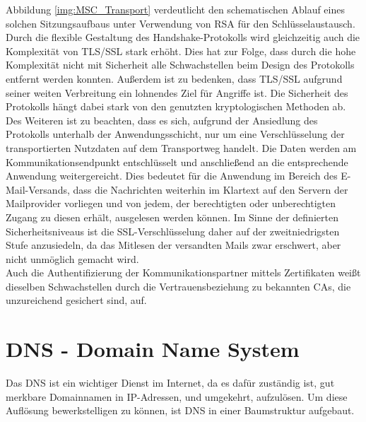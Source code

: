 \documentclass  [paper=a4,
				fontsize=12pt,
				listof=totoc,
				bibliography=totoc
				]{scrreprt}
\begin{document}
			Abbildung \ref{img:MSC_Transport} verdeutlicht den schematischen Ablauf eines solchen Sitzungsaufbaus unter Verwendung von \ac{RSA} für den Schlüsselaustausch.\medskip\\
			Durch die flexible Gestaltung des Handshake-Protokolls wird gleichzeitig auch die Komplexität von \ac{TLS/SSL} stark erhöht. 
			Dies hat zur Folge, dass durch die hohe Komplexität nicht mit Sicherheit alle Schwachstellen beim Design des Protokolls entfernt werden konnten. 
			Außerdem ist zu bedenken, dass \ac{TLS/SSL} aufgrund seiner weiten Verbreitung ein lohnendes Ziel für Angriffe ist. Die Sicherheit des Protokolls hängt dabei stark von den genutzten kryptologischen Methoden ab. \newpage
			Des Weiteren ist zu beachten, dass es sich, aufgrund der Ansiedlung des Protokolls unterhalb der Anwendungsschicht, nur um eine Verschlüsselung der transportierten Nutzdaten auf dem Transportweg handelt. 
			Die Daten werden am Kommunikationsendpunkt entschlüsselt und anschließend an die entsprechende Anwendung weitergereicht.
			Dies bedeutet für die Anwendung im Bereich des E-Mail-Versands, dass die Nachrichten weiterhin im Klartext auf den Servern der Mailprovider vorliegen und von jedem, der berechtigten oder unberechtigten Zugang zu diesen erhält, ausgelesen werden können.
			Im Sinne der definierten Sicherheitsniveaus ist die \ac{SSL}-Verschlüsselung daher auf der zweitniedrigsten Stufe anzusiedeln, da das Mitlesen der versandten Mails zwar erschwert, aber nicht unmöglich gemacht wird.\medskip\\
			Auch die Authentifizierung der Kommunikationspartner mittels Zertifikaten weißt dieselben Schwachstellen durch die Vertrauensbeziehung zu bekannten \acp{CA}, die unzureichend gesichert sind, auf.  
	\section{DNS - Domain Name System}
	\label{sec:dns}
		Das \ac{DNS} ist ein wichtiger Dienst im Internet, da es dafür zuständig ist, gut merkbare Domainnamen in \ac{IP}-Adressen, und umgekehrt, aufzulösen.
		Um diese Auflösung bewerkstelligen zu können, ist \ac{DNS} in einer Baumstruktur aufgebaut.
		
\end{document}
